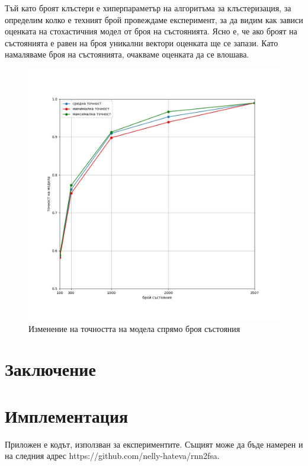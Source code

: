 \documentclass[a4paper,12pt]{article}
\begin{document}
Тъй като броят клъстери е хиперпараметър на алгоритъма за клъстеризация, за определим колко е техният брой провеждаме експеримент, за да видим как зависи оценката на стохастичния модел от броя на състоянията. Ясно е, че ако броят на състоянията е равен на броя уникални вектори оценката ще се запази. Като намаляваме броя на състоянията, очакваме оценката да се влошава. 

\begin{figure}[H]
  \centering
  \includegraphics[width=\textwidth,height=\textheight,keepaspectratio]{figures/number-of-states-accuracy.jpg}
  \caption{Изменение на точността на модела спрямо броя състояния}
\end{figure}

\pagebreak

\section{Заключение}

\section{Имплементация}

Приложен е кодът, използван за експериментите. Същият може да бъде намерен и на следния адрес https://github.com/nelly-hateva/rnn2fsa.
\end{document}

